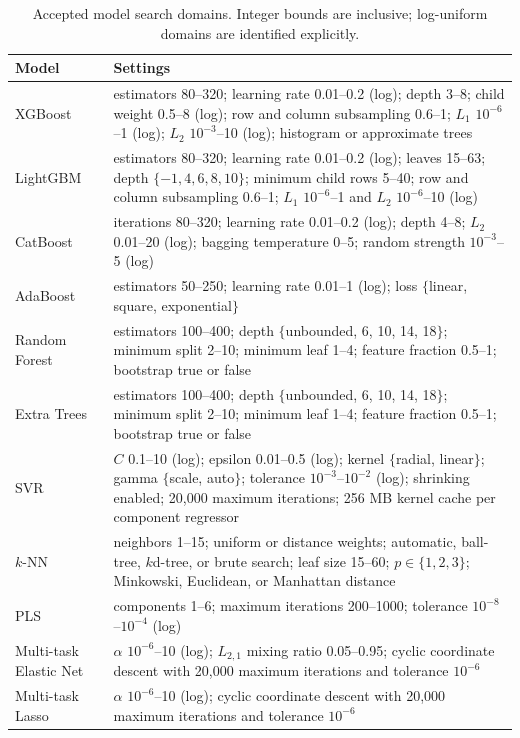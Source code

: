 \documentclass[a4paper,fleqn]{cas-sc}
\begin{document}
\begin{table}[htbp]
\centering
\caption{Accepted model search domains. Integer bounds are inclusive; log-uniform domains are identified explicitly.}
\label{tab:model_hyperparameters}
\scriptsize
\setlength{\tabcolsep}{3pt}
\begin{tabular}{p{2.0cm}p{8.7cm}}
\hline
Model & Settings \\
\hline
XGBoost & estimators 80--320; learning rate 0.01--0.2 (log); depth 3--8; child weight 0.5--8 (log); row and column subsampling 0.6--1; $L_1$ $10^{-6}$--1 (log); $L_2$ $10^{-3}$--10 (log); histogram or approximate trees \\
LightGBM & estimators 80--320; learning rate 0.01--0.2 (log); leaves 15--63; depth $\{-1,4,6,8,10\}$; minimum child rows 5--40; row and column subsampling 0.6--1; $L_1$ $10^{-6}$--1 and $L_2$ $10^{-6}$--10 (log) \\
CatBoost & iterations 80--320; learning rate 0.01--0.2 (log); depth 4--8; $L_2$ 0.01--20 (log); bagging temperature 0--5; random strength $10^{-3}$--5 (log) \\
AdaBoost & estimators 50--250; learning rate 0.01--1 (log); loss $\{$linear, square, exponential$\}$ \\
Random Forest & estimators 100--400; depth $\{$unbounded, 6, 10, 14, 18$\}$; minimum split 2--10; minimum leaf 1--4; feature fraction 0.5--1; bootstrap true or false \\
Extra Trees & estimators 100--400; depth $\{$unbounded, 6, 10, 14, 18$\}$; minimum split 2--10; minimum leaf 1--4; feature fraction 0.5--1; bootstrap true or false \\
SVR & $C$ 0.1--10 (log); epsilon 0.01--0.5 (log); kernel $\{$radial, linear$\}$; gamma $\{$scale, auto$\}$; tolerance $10^{-3}$--$10^{-2}$ (log); shrinking enabled; 20,000 maximum iterations; 256 MB kernel cache per component regressor \\
$k$-NN & neighbors 1--15; uniform or distance weights; automatic, ball-tree, $k$d-tree, or brute search; leaf size 15--60; $p\in\{1,2,3\}$; Minkowski, Euclidean, or Manhattan distance \\
PLS & components 1--6; maximum iterations 200--1000; tolerance $10^{-8}$--$10^{-4}$ (log) \\
Multi-task Elastic Net & $\alpha$ $10^{-6}$--10 (log); $L_{2,1}$ mixing ratio 0.05--0.95; cyclic coordinate descent with 20,000 maximum iterations and tolerance $10^{-6}$ \\
Multi-task Lasso & $\alpha$ $10^{-6}$--10 (log); cyclic coordinate descent with 20,000 maximum iterations and tolerance $10^{-6}$ \\

\end{tabular}
\end{table}
\end{document}
